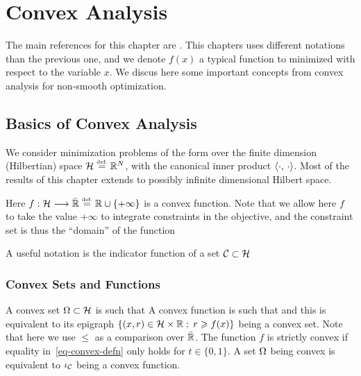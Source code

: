 
\chapter{Convex Analysis}
\label{chap-convex-optim}

The main references for this chapter are \cite{ciarlet1982introduction,boyd2004convex}.
%
This chapters uses different notations than the previous one, and we denote $f(x)$ a typical function to minimized with respect to the variable $x$. 
%
We discus here some important concepts from convex analysis for non-smooth optimization. 


\section{Basics of Convex Analysis}

We consider minimization problems of the form
over the finite dimension (Hilbertian) space $\mathcal{H} \stackrel{\mbox{\upshape\tiny def.}}{=} \mathbb{R}^N$, with the canonical inner product $\langle \cdot,\,\cdot\rangle$. 
%
Most of the results of this chapter extends to possibly infinite dimensional Hilbert space. 

Here $f : \mathcal{H} \longrightarrow \bar {\mathbb{R}} \stackrel{\mbox{\upshape\tiny def.}}{=} \mathbb{R} \cup \{+\infty\}$ is a convex function. Note that we allow here $f$ to take the value $+\infty$ to integrate constraints in the objective, and the constraint set is thus the ``domain'' of the function

A useful notation is the indicator function of a set $\mathcal{C} \subset \mathcal{H}$


\subsection{Convex Sets and Functions}

A convex set $\Omega \subset \mathcal{H}$ is such that
A convex function is such that 
and this is equivalent to its epigraph $\left\{ (x,r) \in \mathcal{H} \times \mathbb{R} \;;\; r \geqslant f(x) \right\}$ being a convex set. Note that here we use $\leq$ as a comparison over $\bar{\mathbb{R}}$. 
%
The function $f$ is strictly convex if equality in~\eqref{eq-convex-defn} only holds for $t \in \{0,1\}$.
%
A set $\Omega$ being convex is equivalent to $\iota_{\mathcal{C}}$ being a convex function.



